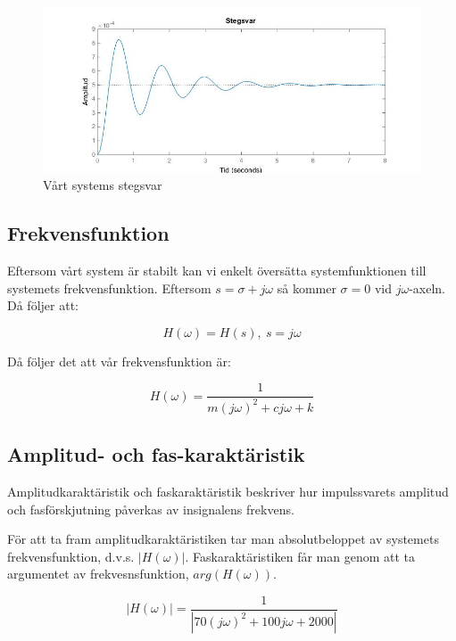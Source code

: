 \documentclass[10pt,a4paper]{article}
\begin{document}
\begin{figure}
\begin{center}
\includegraphics[scale=0.5]{Stegsvar}
\caption{Vårt systems stegsvar}
\end{center}
\end{figure}

\subsection{Frekvensfunktion}
Eftersom vårt system är stabilt kan vi enkelt översätta systemfunktionen till systemets frekvensfunktion. Eftersom $s = \sigma + j\omega$ så kommer $\sigma = 0$ vid $j\omega$-axeln. Då följer att:

\begin{equation}
H(\omega) = H(s), \  s = j\omega
\end{equation}

Då följer det att vår frekvensfunktion är:

\begin{equation}
H(\omega) =  \frac{1}{m (j\omega)^2 + c  j\omega + k}
\end{equation}

\newpage
\subsection{Amplitud- och fas-karaktäristik}

Amplitudkaraktäristik och faskaraktäristik beskriver hur impulssvarets amplitud och fasförskjutning påverkas av insignalens frekvens.

För att ta fram amplitudkaraktäristiken tar man absolutbeloppet av systemets frekvensfunktion, d.v.s. $|H(\omega)|$. Faskaraktäristiken får man genom att ta argumentet av frekvesnsfunktion, $arg(H(\omega))$. 

\begin{equation}
|H(\omega)| = \frac{1}{|70 (j\omega)^2 + 100  j\omega + 2000|}
\end{equation}
\end{document}
